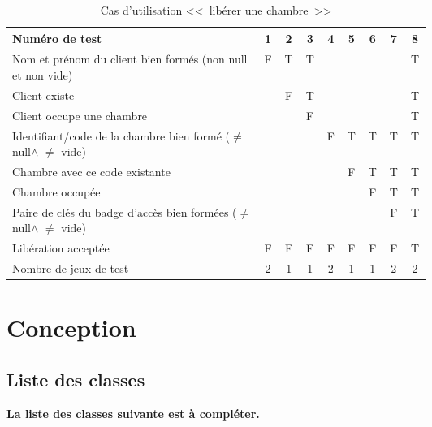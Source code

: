\documentclass[11pt,article]{article}
\newcommand{\nullvalue}{\textsf{null}\xspace}
\begin{document}
        \begin{table}[htbp!]
            \begin{tabular}{|p{0.6\linewidth}|c|c|c|c|c|c|c|c|}
                \hline
                Numéro de test
                    &1&2&3&4&5&6&7&8\\
                \hline
                \hline
                Nom et prénom du client bien formés (non \nullvalue et non vide)
                    &F&T&T& & & & &T\\
                \hline
                Client existe
                    & &F&T& & & & &T\\
                \hline
                Client occupe une chambre
                    & & &F& & & & &T\\
                \hline
                \hline
                Identifiant/code de la chambre bien formé ($\neq$ \nullvalue $\land$ $\neq$ vide)
                    & & & &F&T&T&T&T\\
                \hline
                Chambre avec ce code existante
                    & & & & &F&T&T&T\\
                \hline
                Chambre occupée
                    & & & & & &F&T&T\\
                \hline
                Paire de clés du badge d'accès bien formées ($\neq$ \nullvalue $\land$ $\neq$ vide)
                    & & & & & & &F&T\\
                \hline
                \hline                Libération acceptée
                    &F&F&F&F&F&F&F&T\\
                \hline
                \hline
                Nombre de jeux de test
                    &2&1&1&2&1&1&2&2 \\
                \hline
            \end{tabular}
            \caption{Cas d'utilisation <<~libérer une chambre~>>}
        \end{table}
\newpage

\section{Conception}

\subsection{Liste des classes}

{\color{red}\textbf{La liste des classes suivante est à compléter.}}
\end{document}
